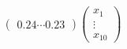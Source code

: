 \documentclass[preview]{standalone}
\begin{document}
\begin{align*}
\begin{pmatrix} 0.24 \cdots 0.23 \end{pmatrix} \begin{pmatrix} x_1\\ \vdots\\ x_{10} \end{pmatrix}
\end{align*}
\end{document}
